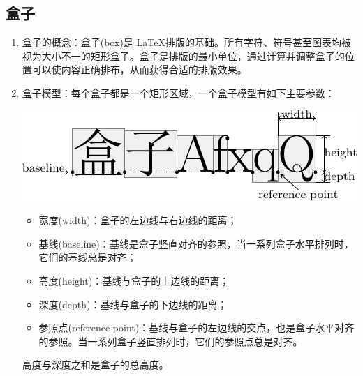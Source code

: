 \subsection{盒子}
\begin{enumerate}

\item 盒子的概念：盒子(box)是 \LaTeX 排版的基础。所有字符、符号甚至图表均被视为大小不一的矩形盒子。盒子是排版的最小单位，通过计算并调整盒子的位置可以使内容正确排布，从而获得合适的排版效果。

\item 盒子模型：每个盒子都是一个矩形区域，一个盒子模型有如下主要参数：

\begin{tcolorbox}[colback=white]
\centering \includegraphics{./resource/tikz/box.pdf}
\end{tcolorbox}

\begin{itemize}
    \item 宽度(width)：盒子的左边线与右边线的距离；
    \item 基线(baseline)：基线是盒子竖直对齐的参照，当一系列盒子水平排列时，它们的基线总是对齐；
    \item 高度(height)：基线与盒子的上边线的距离；
    \item 深度(depth)：基线与盒子的下边线的距离；
    \item 参照点(reference point)：基线与盒子的左边线的交点，也是盒子水平对齐的参照。当一系列盒子竖直排列时，它们的参照点总是对齐。
\end{itemize}

高度与深度之和是盒子的总高度。




\end{enumerate}
